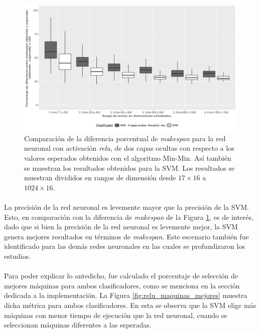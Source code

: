 \begin{figure}[H]
  \centering
  \includegraphics[width=\columnwidth]{imagenes/relu/2_medianas_diferenciasann_2_capas_ocultas_relu.png}
  \caption{Comparación de la diferencia porcentual de \textit{makespan} para la red neuronal con activación \textit{relu}, de dos capas ocultas con respecto a los valores esperados obtenidos con el algoritmo Min-Min. Así también se muestran los resultados obtenidos para la SVM. Los resultados se muestran divididos en rangos de dimensión desde $ 17 \times 16$ a $ 1024 \times 16$.}
  \label{fig:relu_makespan}
\end{figure}

\paragraph{}La precisión de la red neuronal es levemente mayor que la precisión de la SVM. Esto, en comparación con la diferencia de \textit{makespan} de la Figura \ref{fig:relu_makespan}, es de interés, dado que si bien la precisión de la red neuronal es levemente mejor, la SVM genera mejores resultados en términos de \textit{makespan}. Este escenario también fue identificado para las demás redes neuronales en las cuales se profundizaron los estudios. 

\paragraph{} Para poder explicar lo antedicho, fue calculado el porcentaje de selección de mejores máquinas para ambos clasificadores, como se menciona en la sección dedicada a la implementación. La Figura \ref{fig:relu_maquinas_mejores} muestra dicha métrica para ambos clasificadores. En esta se observa que la SVM elige más máquinas con menor tiempo de ejecución que la red neuronal, cuando  se seleccionan máquinas diferentes a las esperadas. 


